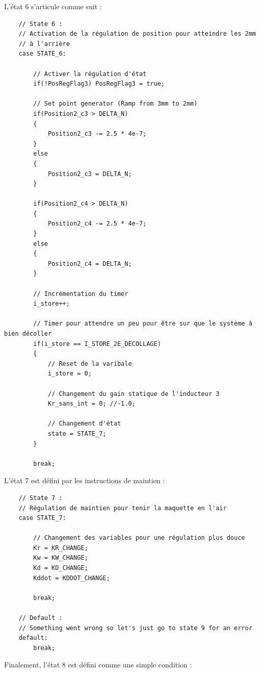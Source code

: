 L'état 6 s'articule comme suit :

\begin{verbatim}
    // State 6 :
    // Activation de la régulation de position pour atteindre les 2mm
    // à l'arrière
    case STATE_6:

        // Activer la régulation d'état
        if(!PosRegFlag3) PosRegFlag3 = true;

        // Set point generator (Ramp from 3mm to 2mm)
        if(Position2_c3 > DELTA_N)
        {
            Position2_c3 -= 2.5 * 4e-7;
        }
        else
        {
            Position2_c3 = DELTA_N;
        }

        if(Position2_c4 > DELTA_N)
        {
            Position2_c4 -= 2.5 * 4e-7;
        }
        else
        {
            Position2_c4 = DELTA_N;
        }

        // Incrémentation du timer
        i_store++;

        // Timer pour attendre un peu pour être sur que le système à bien décoller
        if(i_store == I_STORE_2E_DECOLLAGE)
        {
            // Reset de la varibale
            i_store = 0;

            // Changement du gain statique de l'inducteur 3
            Kr_sans_int = 0; //-1.0;

            // Changement d'état
            state = STATE_7;
        }

        break;
\end{verbatim}

L'état 7 est défini par les instructions de maintien :

\begin{verbatim}
    // State 7 :
    // Régulation de maintien pour tenir la maquette en l'air
    case STATE_7:

        // Changement des variables pour une régulation plus douce
        Kr = KR_CHANGE;
        Kw = KW_CHANGE;
        Kd = KD_CHANGE;
        Kddot = KDDOT_CHANGE;

        break;

    // Default :
    // Something went wrong so let's just go to state 9 for an error
    default:
        break;
\end{verbatim}

Finalement, l'état 8 est défini comme une simple condition :

